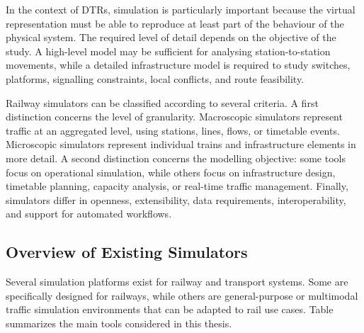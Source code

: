 In the context of DTRs, simulation is particularly important because the virtual representation must be able to reproduce 
at least part of the behaviour of the physical system. The required level of detail depends on the objective of the study. 
A high-level model may be sufficient for analysing station-to-station movements, while a detailed infrastructure model is 
required to study switches, platforms, signalling constraints, local conflicts, and route feasibility.

Railway simulators can be classified according to several criteria. A first distinction concerns the level of granularity. 
Macroscopic simulators represent traffic at an aggregated level, using stations, lines, flows, or timetable events. 
Microscopic simulators represent individual trains and infrastructure elements in more detail. A second distinction 
concerns the modelling objective: some tools focus on operational simulation, while others focus on infrastructure design, 
timetable planning, capacity analysis, or real-time traffic management. Finally, simulators differ in openness, 
extensibility, data requirements, interoperability, and support for automated workflows.

\subsection{Overview of Existing Simulators}
Several simulation platforms exist for railway and transport systems. Some are specifically designed for railways, 
while others are general-purpose or multimodal traffic simulation environments that can be adapted to rail use cases. 
Table~\cite{tab:railway_simulators_comparison} summarizes the main tools considered in this thesis.

